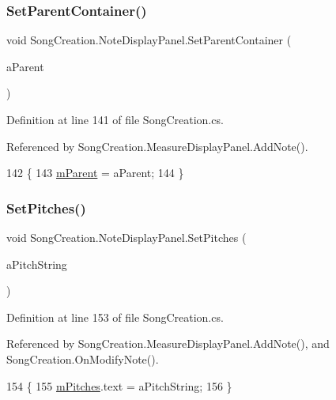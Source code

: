\subsubsection{\texorpdfstring{Set\+Parent\+Container()}{SetParentContainer()}}
{\footnotesize\ttfamily void Song\+Creation.\+Note\+Display\+Panel.\+Set\+Parent\+Container (\begin{DoxyParamCaption}\item[{\hyperlink{class_song_creation_1_1_measure_display_panel}{Measure\+Display\+Panel}}]{a\+Parent }\end{DoxyParamCaption})}



Definition at line 141 of file Song\+Creation.\+cs.



Referenced by Song\+Creation.\+Measure\+Display\+Panel.\+Add\+Note().


\begin{DoxyCode}
142         \{
143             \hyperlink{class_song_creation_1_1_note_display_panel_aa0d0186ce889ffd63cfe7587f48463c9}{mParent} = aParent;
144         \}
\end{DoxyCode}
\mbox{\label{class_song_creation_1_1_note_display_panel_a0f00b32c3c5d6c1bf80e8896388e2099}} 
\subsubsection{\texorpdfstring{Set\+Pitches()}{SetPitches()}}
{\footnotesize\ttfamily void Song\+Creation.\+Note\+Display\+Panel.\+Set\+Pitches (\begin{DoxyParamCaption}\item[{string}]{a\+Pitch\+String }\end{DoxyParamCaption})}



Definition at line 153 of file Song\+Creation.\+cs.



Referenced by Song\+Creation.\+Measure\+Display\+Panel.\+Add\+Note(), and Song\+Creation.\+On\+Modify\+Note().


\begin{DoxyCode}
154         \{
155             \hyperlink{class_song_creation_1_1_note_display_panel_a1bab51528899c56a7944e7d19ec3d8bb}{mPitches}.text = aPitchString;
156         \}
\end{DoxyCode}
\mbox{\label{class_song_creation_1_1_note_display_panel_afcaffdbcc0458ee580b8c8d1373683d7}} 
